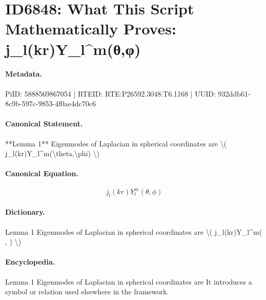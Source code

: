 \section*{ID6848: What This Script Mathematically Proves: j\_l(kr)Y\_l\textasciicircum{}m(θ,φ)}
\paragraph{Metadata.}
PiID: 5888569867054 | RTEID: RTE:P26592.3048:T6.1168 | UUID: 932ddb61-8c9b-597c-9853-4f0ae4dc70c6

\paragraph{Canonical Statement.}
**Lemma 1** Eigenmodes of Laplacian in spherical coordinates are \textbackslash{}( j\_l(kr)Y\_l\textasciicircum{}m(\textbackslash{}theta,\textbackslash{}phi) \textbackslash{})

\paragraph{Canonical Equation.}
\[
j_l(kr)Y_l^m(\theta,\phi)
\]

\paragraph{Dictionary.}
Lemma 1 Eigenmodes of Laplacian in spherical coordinates are \textbackslash{}( j\_l(kr)Y\_l\textasciicircum{}m( , ) \textbackslash{})

\paragraph{Encyclopedia.}
Lemma 1 Eigenmodes of Laplacian in spherical coordinates are It introduces a symbol or relation used elsewhere in the framework.
